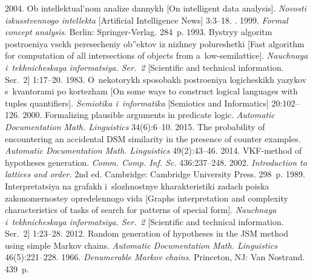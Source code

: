 







  \begin{multicols}{2}

\renewcommand{\bibname}{\protect\rmfamily References}

{\small\frenchspacing
 {%
 \begin{thebibliography}{99} 
 2004. Ob intellektual'nom analize dannykh 
[On intelligent data analysis]. 
\textit{Novosti iskusstvennogo intellekta} [Artificial Intelligence News] 3:3--18.
. 1999. 
\textit{Formal concept analysis}. Berlin: Springer-Verlag. 284~p.
 1993. Bystryy algoritm postroeniya vsekh peresecheniy 
ob''ektov iz nizhney polureshetki 
[Fast algorithm for computation of all intersections of objects from 
a~low-semilattice]. 
\textit{Nauchnaya i~tekhnicheskaya informatsiya. Ser.~2} 
[Scientific and technical information. 
Ser.~2] 1:17--20.
 1983. O~nekotorykh sposobakh po\-stro\-eniya logicheskikh 
yazykov s~kvantorami po kor\-te\-zham [On some ways to construct logical 
languages with tuples quantifiers]. 
\textit{Semiotika i~informatika} [Semiotics and Informatics] 20:102--126.
 2000. Formalizing plausible arguments in predicate logic. 
\textit{Automatic Documentation Math. Linguistics} 34(6):6--10.
 2015. The probability of encountering an accidental 
DSM similarity in the presence of counter examples. 
\textit{Automatic Documentation Math. Linguistics} 49(2):43--46.
 2014. VKF-method of hypotheses generation. 
\textit{Comm. Comp. Inf. Sc.} 436:237--248.
 2002. 
\textit{Introduction to lattices and order.} 2nd ed. 
Cambridge: Cambridge University Press. 298~p.
 1989. Interpretatsiya na grafakh 
i~slozhnostnye kharakteristiki zadach poiska zakonomernostey opredelennogo vida 
[Graphs interpretation and complexity characteristics of tasks of search for 
patterns of special form]. 
\textit{Nauchnaya i~tekhnicheskaya informatsiya. Ser.~2} 
[Scientific and technical information. Ser.~2]  1:23--28. 
 2012. Random generation of hypotheses in the JSM method 
using simple Markov chains. 
\textit{Automatic Documentation Math. Linguistics} 46(5):221--228.
 1966. \textit{Denumerable Markov chains}. Princeton, NJ: Van Nostrand. 439~p.


\end{thebibliography}}}
\end{multicols}
